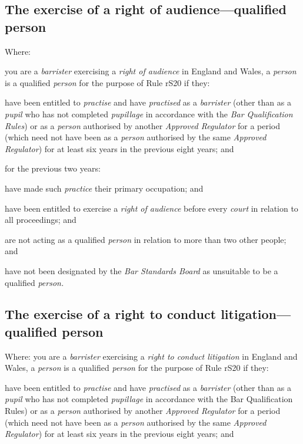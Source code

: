 \subsection{The exercise of a right of audience---qualified person}
\item Where:
\al
\item you are a \emph{barrister} exercising a \emph{right of audience} in
England and Wales, a \emph{person} is a qualified \emph{person} for the
purpose of Rule rS20 if they:
\begin{romlist}
\item have been entitled to \emph{practise} and have \emph{practised} as a
\emph{barrister} (other than as a \emph{pupil} who has not completed
\emph{pupillage} in accordance with the \emph{Bar Qualification Rules})
or as a \emph{person} authorised by another \emph{Approved Regulator}
for a period (which need not have been as a \emph{person} authorised by
the same \emph{Approved Regulator}) for at least six years in the
previous eight years; and

\item for the previous two years:
\begin{numlist}
\item have made such \emph{practice} their primary occupation; and

\item have been entitled to exercise a \emph{right of audience} before
every \emph{court} in relation to all proceedings; and

\item are not acting as a qualified \emph{person} in relation to more
than two other people; and \end{numlist}

\item have not been designated by the \emph{Bar Standards Board} as
unsuitable to be a qualified \emph{person.}
\end{romlist}\la
\subsection{The exercise of a right to conduct litigation---qualified
person}
\item Where:
\all you are a \emph{barrister} exercising a \emph{right to conduct
litigation} in England and Wales, a \emph{person} is a qualified
\emph{person} for the purpose of Rule rS20 if they:

\rl\item have been entitled to \emph{practise} and have \emph{practised} as a
\emph{barrister} (other than as a \emph{pupil} who has not completed
\emph{pupillage} in accordance with the Bar Qualification Rules) or as a
\emph{person} authorised by another \emph{Approved Regulator} for a
period (which need not have been as a \emph{person} authorised by the
same \emph{Approved Regulator}) for at least six years in the previous
eight years; and

